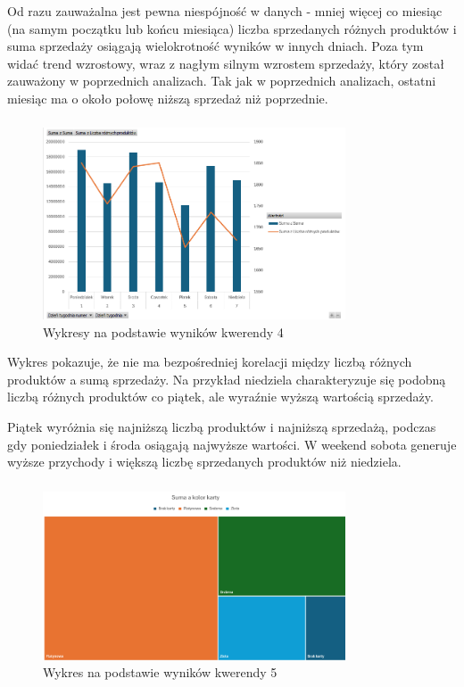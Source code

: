 \documentclass[a4paper,12pt]{article}
\begin{document}
Od razu zauważalna jest pewna niespójność w danych - mniej więcej co miesiąc (na samym początku lub końcu miesiąca) liczba sprzedanych różnych produktów i suma sprzedaży osiągają wielokrotność wyników w innych dniach. Poza tym widać trend wzrostowy, wraz z nagłym silnym wzrostem sprzedaży, który został zauważony w poprzednich analizach. Tak jak w poprzednich analizach, ostatni miesiąc ma o około połowę niższą sprzedaż niż poprzednie.

\subsubsection{}

\begin{figure}[H]
    \centering
    \includegraphics[width=0.8\textwidth]{images/excel/04.png}
    \caption{Wykresy na podstawie wyników kwerendy 4}
\end{figure}

Wykres pokazuje, że nie ma bezpośredniej korelacji między liczbą różnych produktów a sumą sprzedaży. Na przykład niedziela charakteryzuje się podobną liczbą różnych produktów co piątek, ale wyraźnie wyższą wartością sprzedaży.

Piątek wyróżnia się najniższą liczbą produktów i najniższą sprzedażą, podczas gdy poniedziałek i środa osiągają najwyższe wartości. W weekend sobota generuje wyższe przychody i większą liczbę sprzedanych produktów niż niedziela.

\subsubsection{}

\begin{figure}[H]
    \centering
    \includegraphics[width=0.8\textwidth]{images/excel/05.png}
    \caption{Wykres na podstawie wyników kwerendy 5}
\end{figure}
\end{document}

